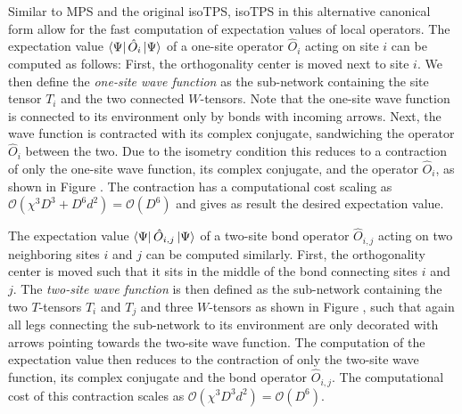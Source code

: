Similar to MPS and the original isoTPS, isoTPS in this alternative canonical form allow for the fast computation of expectation values of local operators. The expectation value $\bra{\Psi}\hat{O}_i\ket{\Psi}$ of a one-site operator $\hat{O}_i$ acting on site $i$ can be computed as follows: First, the orthogonality center is moved next to site $i$. We then define the \textit{one-site wave function} as the sub-network containing the site tensor $T_i$ and the two connected $W$-tensors. Note that the one-site wave function is connected to its environment only by bonds with incoming arrows. Next, the wave function is contracted with its complex conjugate, sandwiching the operator $\hat{O}_i$ between the two. Due to the isometry condition this reduces to a contraction of only the one-site wave function, its complex conjugate, and the operator $\hat{O}_i$, as shown in Figure . The contraction has a computational cost scaling as $\mathcal{O}\left(\chi^3 D^3 + D^6d^2\right) = \mathcal{O}(D^6)$ and gives as result the desired expectation value. \par
The expectation value $\bra{\Psi}\hat{O}_{i,j}\ket{\Psi}$ of a two-site bond operator $\hat{O}_{i,j}$ acting on two neighboring sites $i$ and $j$ can be computed similarly. First, the orthogonality center is moved such that it sits in the middle of the bond connecting sites $i$ and $j$. The \textit{two-site wave function} is then defined as the sub-network containing the two $T$-tensors $T_i$ and $T_j$ and three $W$-tensors as shown in Figure , such that again all legs connecting the sub-network to its environment are only decorated with arrows pointing towards the two-site wave function. The computation of the expectation value then reduces to the contraction of only the two-site wave function, its complex conjugate and the bond operator $\hat{O}_{i,j}$. The computational cost of this contraction scales as $\mathcal{O}\left(\chi^3D^3d^2\right) = \mathcal{O}(D^6)$.